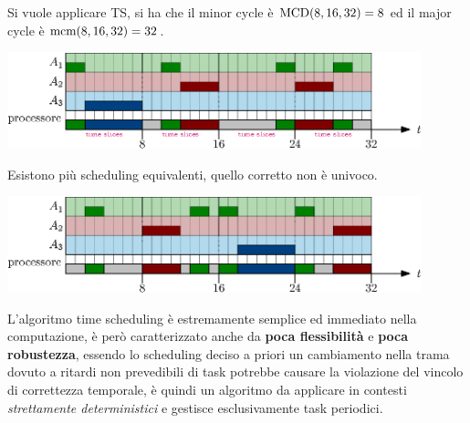 \documentclass[10pt, letterpaper]{report}
\begin{document}
Si vuole applicare TS, si ha che il minor cycle è ${\text{MCD}}(8,16,32)=8$ ed il major cycle 
è ${\text{mcm}}(8,16,32)=32$.\begin{center}
    \includegraphics[width=0.9\textwidth ]{images/TS.eps}
\end{center}
Esistono più scheduling equivalenti, quello corretto non è univoco.\begin{center}
    \includegraphics[width=0.9\textwidth ]{images/TS2.eps}
\end{center}
L'algoritmo time scheduling è estremamente semplice ed immediato nella computazione, è però caratterizzato 
anche da \textbf{poca flessibilità} e \textbf{poca robustezza}, essendo lo scheduling deciso a priori un 
cambiamento nella trama dovuto a ritardi non prevedibili di task potrebbe causare la violazione del vincolo 
di correttezza temporale, è quindi un algoritmo da applicare in contesti \textit{strettamente deterministici} e gestisce 
esclusivamente task periodici. 
\flowerLine 
\end{document}
